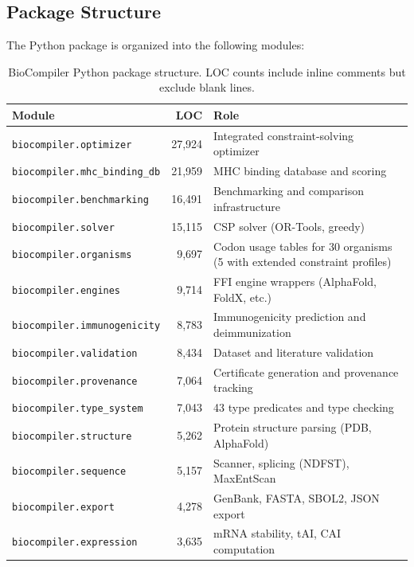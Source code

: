 \documentclass[acmsmall,review,anonymous]{acmart}
\begin{document}
\subsection{Package Structure}\label{sec:package}

The Python package is organized into the following modules:

\begin{table}[t]
\centering
\caption{BioCompiler Python package structure. LOC counts include
         inline comments but exclude blank lines.}
\label{tab:packageloc}
\begin{tabular}{lrp{4.2cm}}
\toprule
\textbf{Module} & \textbf{LOC} & \textbf{Role} \\
\midrule
\texttt{biocompiler.optimizer}        & 27,924 & Integrated constraint-solving optimizer \\
\texttt{biocompiler.mhc\_binding\_db}   & 21,959 & MHC binding database and scoring \\
\texttt{biocompiler.benchmarking}     & 16,491 & Benchmarking and comparison infrastructure \\
\texttt{biocompiler.solver}           & 15,115 & CSP solver (OR-Tools, greedy) \\
\texttt{biocompiler.organisms}        &  9,697 & Codon usage tables for 30 organisms (5 with extended constraint profiles) \\
\texttt{biocompiler.engines}          &  9,714 & FFI engine wrappers (AlphaFold, FoldX, etc.) \\
\texttt{biocompiler.immunogenicity}  &  8,783 & Immunogenicity prediction and deimmunization \\
\texttt{biocompiler.validation}       &  8,434 & Dataset and literature validation \\
\texttt{biocompiler.provenance}       &  7,064 & Certificate generation and provenance tracking \\
\texttt{biocompiler.type\_system}      &  7,043 & 43 type predicates and type checking \\
\texttt{biocompiler.structure}        &  5,262 & Protein structure parsing (PDB, AlphaFold) \\
\texttt{biocompiler.sequence}        &  5,157 & Scanner, splicing (NDFST), MaxEntScan \\
\texttt{biocompiler.export}           &  4,278 & GenBank, FASTA, SBOL2, JSON export \\
\texttt{biocompiler.expression}       &  3,635 & mRNA stability, tAI, CAI computation \\

\end{tabular}
\end{table}
\end{document}
